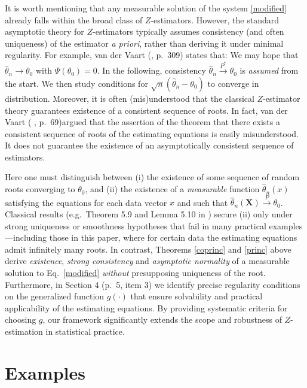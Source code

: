 \documentclass[10pt,a4paper,onecolumn]{article} %
\begin{document}
It is worth mentioning that any measurable solution of the system \eqref{modified} already falls within the broad class of $Z$-estimators. However, the standard asymptotic theory for $Z$-estimators typically assumes consistency (and often uniqueness) of the estimator \emph{a priori}, rather than deriving it under minimal regularity.  For example, van der Vaart (\cite{1996-Vaart}, p.~309) states that:
  We may hope that $\hat\theta_n\to\theta_0$ with $\Psi(\theta_0)=0$.  In the following, consistency $\hat\theta_n\xrightarrow{P^*}\theta_0$ is \emph{assumed} from the start.  We then study conditions for $\sqrt{n}(\hat\theta_n-\theta_0)$ to converge in distribution.
Moreover, it is often (mis)understood that the classical $Z$-estimator theory guarantees existence of a consistent sequence of roots.  In fact, van der Vaart (\cite{1998-Vaart} , p.~69)argued that the assertion of the theorem that there exists a consistent sequence of roots of the estimating equations is easily misunderstood.  It does not guarantee the existence of an asymptotically consistent sequence of estimators.

Here one must distinguish between (i) the existence of some sequence of random roots converging to $\theta_0$, and (ii) the existence of a \emph{measurable} function $\hat\theta_n(x)$ satisfying the equations for each data vector $x$ and such that $\hat\theta_n(\mathbf X)\xrightarrow{P}\theta_0$.  Classical results (e.g.\ Theorem 5.9 and Lemma 5.10 in \cite{1998-Vaart}) secure (ii) only under strong uniqueness or smoothness hypotheses that fail in many practical examples—including those in this paper, where for certain data the estimating equations admit infinitely many roots. In contrast, Theorems \ref{coprinc} and \ref{princ} above derive \emph{existence}, \emph{strong consistency} and \emph{asymptotic normality} of a measurable solution to Eq.~\eqref{modified} \emph{without} presupposing uniqueness of the root.  Furthermore, in Section 4 (p.~5, item 3) we identify precise regularity conditions on the generalized function $g(\cdot)$ that ensure solvability and practical applicability of the estimating equations.  By providing systematic criteria for choosing $g$, our framework significantly extends the scope and robustness of $Z$-estimation in statistical practice.



\section{Examples}
\end{document}
